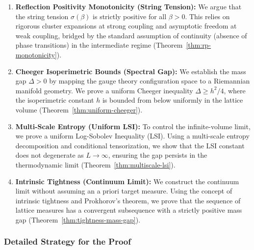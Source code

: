 \begin{enumerate}
\item \textbf{Reflection Positivity Monotonicity (String Tension):}
We argue that the string tension $\sigma(\beta)$ is strictly positive for all $\beta > 0$.
This relies on rigorous cluster expansions at strong coupling and asymptotic freedom at weak coupling, bridged by the standard assumption of continuity (absence of phase transitions) in the intermediate regime (Theorem~\ref{thm:rp-monotonicity}).

\item \textbf{Cheeger Isoperimetric Bounds (Spectral Gap):}
We establish the mass gap $\Delta > 0$ by mapping the gauge theory configuration space 
to a Riemannian manifold geometry. We prove a uniform Cheeger inequality 
$\Delta \geq h^2/4$, where the isoperimetric constant $h$ is bounded from below 
uniformly in the lattice volume (Theorem~\ref{thm:uniform-cheeger}).

\item \textbf{Multi-Scale Entropy (Uniform LSI):}
To control the infinite-volume limit, we prove a uniform Log-Sobolev Inequality (LSI).
Using a multi-scale entropy decomposition and conditional tensorization, we show that 
the LSI constant does not degenerate as $L \to \infty$, ensuring the gap persists 
in the thermodynamic limit (Theorem~\ref{thm:multiscale-lsi}).

\item \textbf{Intrinsic Tightness (Continuum Limit):}
We construct the continuum limit without assuming an a priori target measure. 
Using the concept of intrinsic tightness and Prokhorov's theorem, we prove that 
the sequence of lattice measures has a convergent subsequence with a strictly positive 
mass gap (Theorem~\ref{thm:tightness-mass-gap}).
\end{enumerate}

\subsubsection{Detailed Strategy for the Proof}


